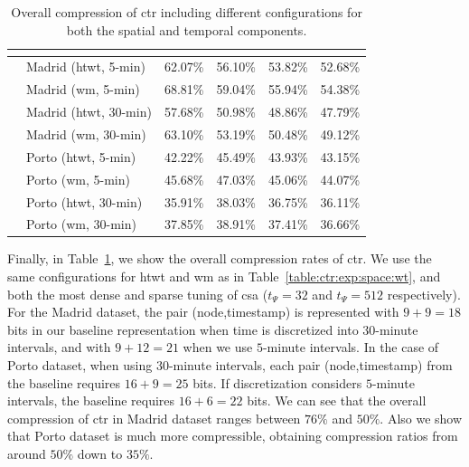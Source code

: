 \begin{table}[ht]
\begin{center}
\begin{tabular}{|c|l|*{4}{c}|}
	  \multicolumn{5}{c}{} \\
	  \hline   
	  \multirow{8}{*}{\STAB{\rotatebox[origin=c]{90}{$t_{\Psi}=512$}}}
	   & Madrid (\gls{htwt}, 5-min) & 62.07\% &	56.10\% &	53.82\% &	 52.68\% \\
	   & Madrid (\gls{wm}, 5-min)   & 68.81\% &	59.04\% &	55.94\% &	 54.38\% \\
	   & Madrid (\gls{htwt}, 30-min) &  57.68\% &	50.98\% &	48.86\% &	 47.79\% \\
	   & Madrid (\gls{wm}, 30-min)  & 63.10\% &	53.19\% &	50.48\% &	 49.12\% \\
	  \cline{2-6}
	   & Porto (\gls{htwt}, 5-min)   & 42.22\% &	45.49\% &	43.93\% &	 43.15\% \\
	   & Porto (\gls{wm}, 5-min)      & 45.68\% &	47.03\% &	45.06\% &	 44.07\% \\
	   & Porto (\gls{htwt}, 30-min)  & 35.91\% &	38.03\% &	36.75\% &	 36.11\% \\
	   & Porto (\gls{wm}, 30-min)   & 37.85\% &	38.91\% &	37.41\% &	 36.66\% \\
	  \hline
	  \end{tabular}
	\caption{Overall compression of \acrshort{ctr} including different configurations for both the spatial and temporal components.}
	\label{table:ctr:exp:space:ctr}
	\end{center}
	\end{table}


	Finally, in Table~\ref{table:ctr:exp:space:ctr}, we show the overall compression rates of  \gls{ctr}.
	We use the same configurations for \gls{htwt} and \gls{wm}  as in Table~\ref{table:ctr:exp:space:wt}, and both the
	most dense and sparse tuning of \gls{csa} ($t_{\Psi}= 32$ and $t_{\Psi}= 512$ respectively).
	For the Madrid dataset, the pair (node,timestamp) is represented with $9+9=18$ bits in our baseline representation 
	when time is discretized into $30$-minute intervals, and with $9+12=21$ when we use $5$-minute intervals.
	In the case of Porto dataset, when using $30$-minute intervals, each pair (node,timestamp) from the baseline requires $16+9=25$ bits. 
	If discretization considers $5$-minute intervals, the baseline requires $16+6=22$ bits. We can see that the overall
	compression of \gls{ctr} in Madrid dataset ranges between $76\%$ and $50\%$. Also we show that Porto dataset is much
	more compressible, obtaining compression ratios from around $50\%$ down to $35\%$.


